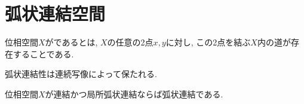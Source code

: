 \documentclass[uplatex, dvipdfmx, a4paper, 12pt, class=jsbook, crop=false]{standalone}
\begin{document}
\section{弧状連結空間}
\label{sec:path-connected-spaces}

\newcommand{\loclabel}[1]{\label{LocalLabel-\thepart-\thechapter-\thesection:#1}}

\begin{definition}
	位相空間$ X $がであるとは, $ X $の任意の2点$ x, y $に対し, この2点を結ぶ$ X $内の道が存在することである.　
\end{definition}

\begin{proposition}
	\loclabel{prop:Continuous maps preserve pathconnectedness}
	弧状連結性は連続写像によって保たれる.
\end{proposition}

\begin{proposition}
	\loclabel{prop:Ctd+LocPathCtd>PathCtd}
	位相空間$ X $が連結かつ局所弧状連結ならば弧状連結である.
\end{proposition}
\end{document}
